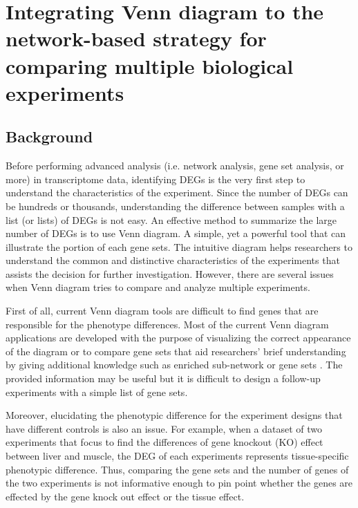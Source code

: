 \documentclass[oneside,phd]{snuthesis}
\begin{document}
\chapter{Integrating Venn diagram to the network-based strategy for comparing multiple biological experiments}

\section{Background}

Before performing advanced analysis (i.e. network analysis, gene set analysis, or more) in transcriptome data, identifying DEGs is the very first step to understand the characteristics of the experiment. 
Since the number of DEGs can be hundreds or thousands, understanding the difference between samples with a list (or lists) of DEGs is not easy.
An effective method to summarize the large number of DEGs is to use Venn diagram.
A simple, yet a powerful tool that can illustrate the portion of each gene sets. 
The intuitive diagram helps researchers to understand the common and distinctive characteristics of the experiments that assists the decision for further investigation.
However, there are several issues when Venn diagram tries to compare and analyze multiple experiments.

First of all, current Venn diagram tools are difficult to find genes that are responsible for the phenotype differences. 
Most of the current Venn diagram applications are developed with the purpose of visualizing the correct appearance of the diagram or to compare gene sets that aid researchers' brief understanding by giving additional knowledge such as enriched sub-network or gene sets \citep{kestler2004generalized, martin2012vennture,kestler2008vennmaster, chen2011venndiagram, heberle2015interactivenn, hulsen2008biovenn, wang2014netvenn, jeggari2018evinet}.
The provided information may be useful but it is difficult to design a follow-up experiments with a simple list of gene sets.

Moreover, elucidating the phenotypic difference for the experiment designs that have different controls is also an issue.
For example, when a dataset of two experiments that focus to find the differences of gene knockout (KO) effect between liver and muscle, the DEG of each experiments represents tissue-specific phenotypic difference.
Thus, comparing the gene sets and the number of genes of the two experiments is not informative enough to pin point whether the genes are effected by the gene knock out effect or the tissue effect.
\end{document}
